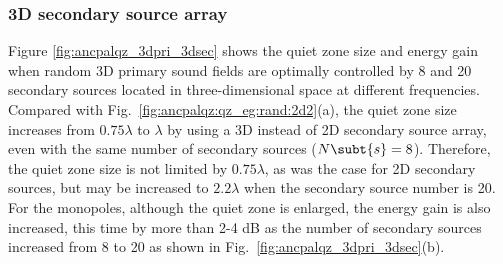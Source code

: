 \subsubsection{3D secondary source array}

Figure \ref{fig:ancpalqz_3dpri_3dsec} shows the quiet zone size and energy gain when random 3D primary sound fields are optimally controlled by 8 and 20 secondary sources located in three-dimensional space at different frequencies. 
Compared with Fig.~\ref{fig:ancpalqz:qz_eg:rand:2d2}(a), the quiet zone size increases from $0.75\lambda$ to $\lambda$ by using a 3D instead of 2D secondary source array, even with the same number of secondary sources ($N\subt{s} = 8$). 
Therefore, the quiet zone size is not limited by $0.75\lambda$, as was the case for 2D secondary sources, but may be increased to $2.2\lambda$ when the secondary source number is 20. 
For the monopoles, although the quiet zone is enlarged, the energy gain is also increased, this time by more than 2-4 dB as the number of secondary sources increased from 8 to 20 as shown in Fig.~\ref{fig:ancpalqz_3dpri_3dsec}(b).


